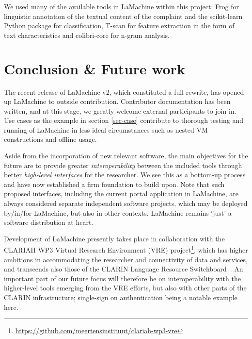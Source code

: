 \documentclass[a4paper,11pt]{article}
\begin{document}
We used many of the available tools in LaMachine within this project: Frog for linguistic annotation of the textual
content of the complaint and the scikit-learn Python package for classification, T-scan for feature extraction in the form of text characteristics and colibri-core for n-gram analysis.


\section{Conclusion \& Future work}

The recent release of LaMachine v2, which constituted a full rewrite, has opened up LaMachine to outside
contribution. Contributor documentation has been written, and at this stage, we greatly welcome external participants
to join in. Use cases as the example in section \ref{sec-case} contribute to thorough testing and running of LaMachine in less ideal circumstances such as nested VM constructions and offline usage.

Aside from the incorporation of new relevant software, the main objectives for the future are to provide
greater \emph{interoperability} between the included tools through better \emph{high-level interfaces} for the
researcher. We see this as a bottom-up process and have now established a firm foundation to build upon. Note that such
proposed interfaces, including the current portal application in LaMachine, are always considered separate independent
software projects, which may be deployed by/in/for LaMachine, but also in other contexts. LaMachine remains `just'
a software distribution at heart.

Development of LaMachine presently takes place in collaboration with the CLARIAH WP3 Virtual Research Environment (VRE)
project\footnote{\url{https://github.com/meertensinstituut/clariah-wp3-vre}}, which has higher ambitions in
accommodating the researcher and connectivity of data and services, and transcends also those of the CLARIN Language
Resource Switchboard~\cite{switchboard}. An important part of our future focus will therefore be on interoperability
with the higher-level tools emerging from the VRE efforts, but also with other parts of the CLARIN infrastructure;
single-sign on authentication being a notable example here.
\end{document}
